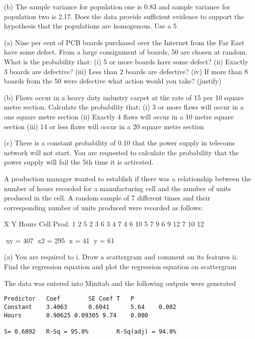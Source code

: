 (b) 	The sample variance for population one is 0.83 and sample variance for population two is 2.17.  Does the data provide sufficient evidence to support the hypothesis that the populations are homogenous.  Use a 5%



(a)  	Nine per cent of PCB boards purchased over the Internet from the Far East have some defect.  From a large consignment of boards, 50 are chosen at random.  What is the probability that:
(i)	5 or more boards have some defect?
(ii)	Exactly 3 boards are defective?
(iii)	Less than 2 boards are defective?
(iv)	If more than 8 boards from the 50 were defective what action would you take? (justify)


(b) 	Flaws occur in a heavy duty industry carpet at the rate of 15 per 10 square metre section.  Calculate the probability that:
(i)	3 or more flaws will occur in a one square metre section
(ii)	Exactly 4 flaws will occur in a 10 metre square section
(iii)	14 or less flaws will occur in a 20 square metre section

(c)	There is a constant probability of 0.10 that the power supply in telecoms network will not start.  You are requested to calculate the probability that the power supply will fail the 5th time it is activated.


A production manager wanted to establish if there was a relationship between the number of hours recorded for a manufacturing cell and the number of units produced in the cell.  A random sample of 7 different times and their corresponding number of units produced were recorded as follows:


	X	Y
	Hours	Cell Prod.
1	2	5
2	3	6
3	4	7
4	6	10
5	7	9
6	9	12
7	10	12
	
	xy = 407		x2 = 295		x = 41		y = 61

(a) 	You are required to 
i.	Draw a scattergram and comment on its features
ii.	Find the regression equation and plot the regression equation on scattergram


The data was entered into Minitab and the following outputs were generated

\begin{verbatim}
Predictor	Coef		SE Coef	T	P
Constant	3.4063		0.6041		5.64	0.002
Hours		0.90625	0.09305	9.74	0.000

S= 0.6892	R-Sq = 95.0%		R-Sq(adj) = 94.0%
\end{verbatim}

